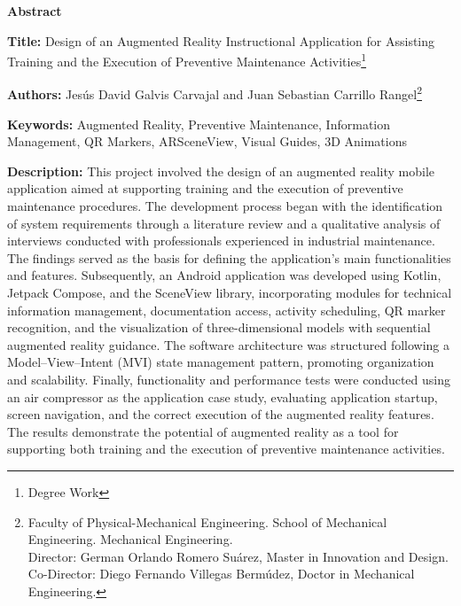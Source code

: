 \vspace{1em}

\clearpage

\begin{center}
\textbf{Abstract}\par
\end{center}

\vspace{\baselineskip}
\noindent
\textbf{Title:} Design of an Augmented Reality Instructional Application for Assisting Training and the Execution of Preventive Maintenance Activities\footnote[1]{Degree Work}

\noindent
\textbf{Authors:} Jesús David Galvis Carvajal and Juan Sebastian Carrillo Rangel\footnote[2]{Faculty of Physical-Mechanical Engineering. School of Mechanical Engineering. Mechanical Engineering. \\ Director: German Orlando Romero Suárez, Master in Innovation and Design. \\ Co-Director: Diego Fernando Villegas Bermúdez, Doctor in Mechanical Engineering.}

\noindent
\textbf{Keywords:} Augmented Reality, Preventive Maintenance, Information Management, QR Markers, ARSceneView, Visual Guides, 3D Animations

\vspace{\baselineskip}

\noindent
\textbf{Description:} This project involved the design of an augmented reality mobile application aimed at supporting training and the execution of preventive maintenance procedures. The development process began with the identification of system requirements through a literature review and a qualitative analysis of interviews conducted with professionals experienced in industrial maintenance. The findings served as the basis for defining the application's main functionalities and features. Subsequently, an Android application was developed using Kotlin, Jetpack Compose, and the SceneView library, incorporating modules for technical information management, documentation access, activity scheduling, QR marker recognition, and the visualization of three-dimensional models with sequential augmented reality guidance. The software architecture was structured following a Model–View–Intent (MVI) state management pattern, promoting organization and scalability. Finally, functionality and performance tests were conducted using an air compressor as the application case study, evaluating application startup, screen navigation, and the correct execution of the augmented reality features. The results demonstrate the potential of augmented reality as a tool for supporting both training and the execution of preventive maintenance activities.